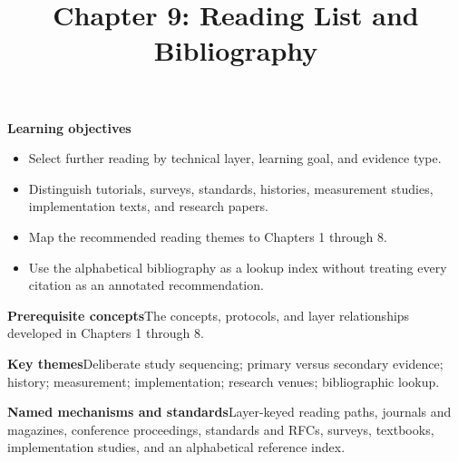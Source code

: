 \documentclass[10pt,letterpaper]{article}
\title{Chapter 9: Reading List and Bibliography}
\author{}
\date{}
\begin{document}
\maketitle
{}
\begin{overviewbox}
\textbf{Learning objectives}\begin{itemize}
  \item Select further reading by technical layer, learning goal, and evidence type.
  \item Distinguish tutorials, surveys, standards, histories, measurement studies, implementation texts, and research papers.
  \item Map the recommended reading themes to Chapters 1 through 8.
  \item Use the alphabetical bibliography as a lookup index without treating every citation as an annotated recommendation.
\end{itemize}
\textbf{Prerequisite concepts}\quad The concepts, protocols, and layer relationships developed in Chapters 1 through 8.\par
\textbf{Key themes}\quad Deliberate study sequencing; primary versus secondary evidence; history; measurement; implementation; research venues; bibliographic lookup.\par
\textbf{Named mechanisms and standards}\quad Layer-keyed reading paths, journals and magazines, conference proceedings, standards and RFCs, surveys, textbooks, implementation studies, and an alphabetical reference index.
\end{overviewbox}

\end{document}
